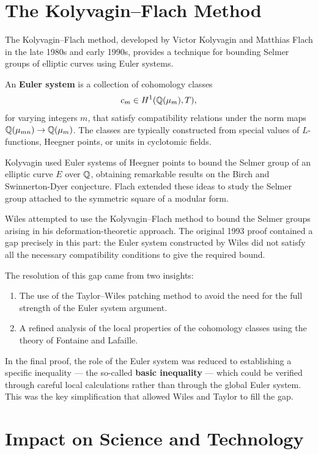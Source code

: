 \section{The Kolyvagin--Flach Method}

The Kolyvagin--Flach method, developed by Victor Kolyvagin and Matthias Flach in the late 1980s and early 1990s, provides a technique for bounding Selmer groups of elliptic curves using Euler systems.

An \textbf{Euler system} is a collection of cohomology classes
\[
c_m \in H^1(\mathbb{Q}(\mu_m), T),
\]
for varying integers \(m\), that satisfy compatibility relations under the norm maps \(\mathbb{Q}(\mu_{mn}) \to \mathbb{Q}(\mu_m)\). The classes are typically constructed from special values of \(L\)-functions, Heegner points, or units in cyclotomic fields.

Kolyvagin used Euler systems of Heegner points to bound the Selmer group of an elliptic curve \(E\) over \(\mathbb{Q}\), obtaining remarkable results on the Birch and Swinnerton-Dyer conjecture. Flach extended these ideas to study the Selmer group attached to the symmetric square of a modular form.

Wiles attempted to use the Kolyvagin--Flach method to bound the Selmer groups arising in his deformation-theoretic approach. The original 1993 proof contained a gap precisely in this part: the Euler system constructed by Wiles did not satisfy all the necessary compatibility conditions to give the required bound.

The resolution of this gap came from two insights:
\begin{enumerate}
    \item The use of the Taylor--Wiles patching method to avoid the need for the full strength of the Euler system argument.
    \item A refined analysis of the local properties of the cohomology classes using the theory of Fontaine and Lafaille.
\end{enumerate}

In the final proof, the role of the Euler system was reduced to establishing a specific inequality --- the so-called \textbf{basic inequality} --- which could be verified through careful local calculations rather than through the global Euler system. This was the key simplification that allowed Wiles and Taylor to fill the gap.

\section{Impact on Science and Technology}

